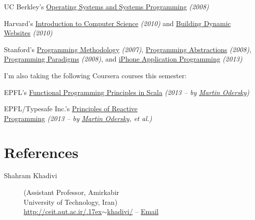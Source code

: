 \documentclass{tccv}
\renewcommand{\tilde}{\raise.17ex\hbox{$\scriptstyle\sim$}}
\begin{document}
{{\begin{list}{}{\leftmargin=1em}
\item UC Berkley's \href{http://www.cs.berkeley.edu/~kubitron/courses/cs162-F08/}{Operating Systems and Systems Programming} {\it(2008)}

\item Harvard's \href{http://cs50.tv/2010/fall/}{Introduction to Computer Science} {\it(2010)} and \href{http://cs75.tv/2010/fall/}{Building Dynamic Websites} {\it(2010)}

\item Stanford's \href{http://see.stanford.edu/see/courseinfo.aspx?coll=824a47e1-135f-4508-a5aa-866adcae1111}{Programming Methodology} {\it(2007)}, \href{http://see.stanford.edu/see/courseinfo.aspx?coll=11f4f422-5670-4b4c-889c-008262e09e4e}{\mbox{Programming} Abstractions} {\it(2008)}, \href{http://see.stanford.edu/see/courseinfo.aspx?coll=2d712634-2bf1-4b55-9a3a-ca9d470755ee}{\mbox{Programming} Paradigms} {\it(2008)}, and \href{http://www.stanford.edu/class/cs193p}{iPhone Application Programming} {\it(2013)}
	
\end{list}

I'm also taking the following Coursera courses this semester: 

\begin{list}{}{\leftmargin=1em}

\item EPFL's \href{https://www.coursera.org/course/progfun}{Functional Programming Principles in Scala} {\it(2013 -- by \href{https://en.wikipedia.org/wiki/Martin_Odersky}{Martin Odersky})}

\item EPFL/Typesafe Inc.'s \href{https://www.coursera.org/course/reactive}{Principles of Reactive\\ Programming} {\it(2013 -- by \href{https://en.wikipedia.org/wiki/Martin_Odersky}{Martin Odersky}, et al.)}

\end{list}








\section{References}

\begin{description}
\item[Shahram Khadivi] (Assistant Professor, Amirkabir \\University of Technology, Iran)
\\
\href{http://ceit.aut.ac.ir/~khadivi/}{http://ceit.aut.ac.ir/{\tilde}khadivi/} -- \href{mailto:khadivi@aut.ac.ir}{Email}
\end{description}


}}
\end{document}
